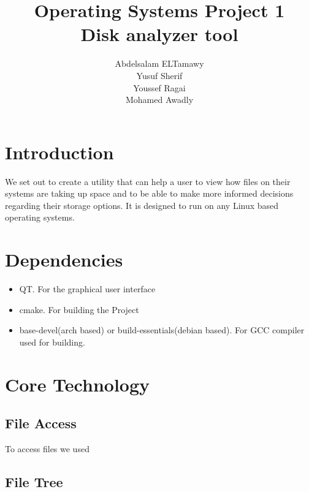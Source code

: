 \documentclass[]{article}
\author{Abdelsalam ELTamawy\\Yusuf Sherif\\Youssef Ragai\\Mohamed Awadly}
\title{Operating Systems Project 1\\Disk analyzer tool}
\begin{document}
    \maketitle

    \section{Introduction}
    We set out to create a utility that can help a user to view how files on their systems are taking up space and to be able to make more informed decisions regarding their storage options.
    It is designed to run on any Linux based operating systems.
    
    \section{Dependencies}
    \begin{itemize}
        \item QT. For the graphical user interface
        \item cmake. For building the Project
        \item base-devel(arch based) or build-essentials(debian based). For GCC compiler used for building.
    \end{itemize}

    \section{Core Technology}
    \subsection{File Access}
    To access files we used 

    \subsection{File Tree}
\end{document}
